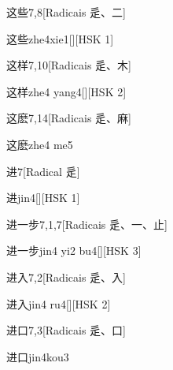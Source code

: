 \begin{entry}{这些}{7,8}[Radicais ⾡、⼆]
  \begin{phonetics}{这些}{zhe4xie1}[][HSK 1]
  \end{phonetics}
\end{entry}

\begin{entry}{这样}{7,10}[Radicais ⾡、⽊]
  \begin{phonetics}{这样}{zhe4 yang4}[][HSK 2]
  \end{phonetics}
\end{entry}

\begin{entry}{这麽}{7,14}[Radicais ⾡、⿇]
  \begin{phonetics}{这麽}{zhe4 me5}
  \end{phonetics}
\end{entry}

\begin{entry}{进}{7}[Radical ⾡]
  \begin{phonetics}{进}{jin4}[][HSK 1]
  \end{phonetics}
\end{entry}

\begin{entry}{进一步}{7,1,7}[Radicais ⾡、⼀、⽌]
  \begin{phonetics}{进一步}{jin4 yi2 bu4}[][HSK 3]
  \end{phonetics}
\end{entry}

\begin{entry}{进入}{7,2}[Radicais ⾡、⼊]
  \begin{phonetics}{进入}{jin4 ru4}[][HSK 2]
  \end{phonetics}
\end{entry}

\begin{entry}{进口}{7,3}[Radicais ⾡、⼝]
  \begin{phonetics}{进口}{jin4kou3}
  \end{phonetics}
\end{entry}

